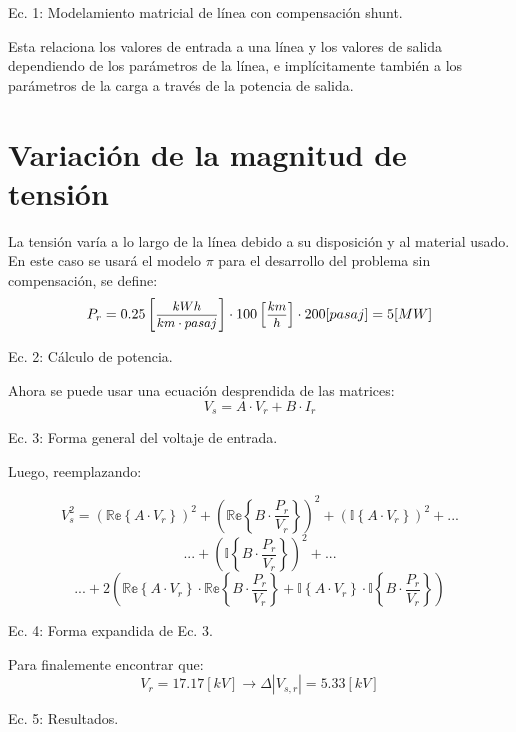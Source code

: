 \documentclass[conference]{IEEEtran}
\begin{document}
\begin{center}
\small {Ec. 1: Modelamiento matricial de línea con compensación shunt.}
\end{center}


\indent Esta relaciona los valores de entrada a una línea y los valores de salida dependiendo de los parámetros de la línea, e implícitamente
también a los parámetros de la carga a través de la potencia de salida.
\section{Variación de la magnitud de tensión}
La tensión varía a lo largo de la línea debido a su disposición y al material usado. En este caso se usará el modelo $\pi$ para el desarrollo
del problema sin compensación, se define:
$$
P_{r}=0.25\left [\text{\small $\frac{kWh}{km\cdot pasaj}$}\right ]\cdot100\left [\text{\small $\frac{km}{h}$}\right ]\cdot200[pasaj]=5[MW]
$$
\begin{center}
\small{Ec. 2: Cálculo de potencia.}
\end{center}
Ahora se puede usar una ecuación desprendida de las matrices:
$$
V_{s}=A\cdot V_{r}+B\cdot I_{r}
$$
\begin{center}
\small{Ec. 3: Forma general del voltaje de entrada.}
\end{center}
Luego, reemplazando:

$$
V_{s}^{2}=\left( \mathbb{Re}\left \{ A\cdot V_{r} \right \} \right )^{2}+\left(\mathbb{Re}\left \{ B\cdot \frac{P_{r}}{V_{r}} \right \}\right )^{2}+\left(\mathbb{I}\left \{ A\cdot V_{r} \right \}\right )^{2}+...
$$$$
...+\left(\mathbb{I}\left \{ B\cdot \frac{P_{r}}{V_{r}} \right \}\right )^{2}+...
$$$$
 ...+2\left( \mathbb{Re}\left \{ A\cdot V_{r} \right \} \cdot\mathbb{Re}\left \{ B\cdot \frac{P_{r}}{V_{r}} \right \}+\mathbb{I}\left \{ A\cdot V_{r} \right \}\cdot\mathbb{I}\left \{ B\cdot \frac{P_{r}}{V_{r}} \right \}\right)
$$
\begin{center}
\small{Ec. 4: Forma expandida de Ec. 3.}
\end{center}
Para finalemente encontrar que:
$$
V_{r}=17.17[kV] \rightarrow  \Delta \left | V_{s,r} \right| =5.33[kV]
$$

\begin{center}
\small{Ec. 5: Resultados.}
\end{center}
\end{document}
